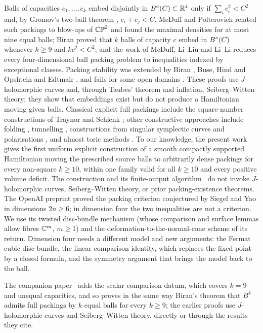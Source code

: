 Balls of capacities $c_1,\dots,c_k$ embed disjointly in $B^{\circ}(C)\subset\mathbb{R}^4$ only if $\sum_ic_i^2<C^2$ and, by Gromov's
two-ball theorem \cite{Gromov1985}, $c_i+c_j<C$. McDuff and Polterovich \cite{McDuffPolterovich1994} related such
packings to blow-ups of $\mathbb{CP}^2$ and found the maximal densities for at most nine equal balls; Biran
\cite{Biran1997} proved that $k$ balls of capacity $c$ embed in $B^{\circ}(C)$ whenever $k\ge9$ and $kc^2<C^2$; and the work
of McDuff, Li--Liu and Li--Li \cite{McDuff1991,McDuff1998,LiLiu2001,LiLi2002} reduces every four-dimensional ball
packing problem to inequalities indexed by exceptional classes. Packing stability was extended by Biran \cite{Biran1999}, Buse, Hind and Opshtein
\cite{BuseHind2011,BuseHind2013,BuseHindOpshtein2016} and Edtmair \cite{Edtmair2025}, and fails for some open domains
\cite{CristofaroGardinerHind2023}. These proofs use $J$-holomorphic curves and, through Taubes' theorem and inflation,
Seiberg--Witten theory; they show that embeddings exist but do not produce a Hamiltonian moving given balls.
Classical explicit full packings include the square-number constructions of Traynor \cite{Traynor1995} and Schlenk
\cite{SchlenkHand,SchlenkBook,Schlenk2018}; other constructive approaches include folding \cite{SchlenkFolding},
tunnelling \cite{Wieck2009}, constructions from singular symplectic curves and polarisations \cite{Opshtein2011,Opshtein2013},
and almost toric methods \cite{Symington2003,CasalsVianna2020}. To our knowledge, the present work gives the first
uniform explicit construction of a smooth compactly supported Hamiltonian moving the prescribed source balls to
arbitrarily dense packings for every non-square $k\ge10$, within one family valid for all $k\ge10$ and every positive
volume deficit. The construction and its finite-output algorithm~\cite{SongHD} do not invoke $J$-holomorphic curves,
Seiberg--Witten theory, or prior packing-existence theorems. The OpenAI preprint \cite{OpenAI2026} proved the packing
criterion conjectured by Siegel and Yao \cite{SiegelYao2025} in dimensions $2n\ge6$; in dimension four the two
inequalities are not a criterion. We use its twisted disc-bundle mechanism (whose comparison and surface lemmas allow
fibres $\mathbb{C}^m$, $m\ge1$) and the deformation-to-the-normal-cone scheme of its return. Dimension four needs a different
model and new arguments: the Fermat cubic disc bundle, the linear comparison identity, which replaces the fixed point by
a closed formula, and the symmetry argument that brings the model back to the ball.

The companion paper~\cite{SongHD} adds the scalar comparison datum, which covers $k=9$ and unequal capacities, and so
proves in the same way Biran's theorem \cite{Biran1997} that $B^4$ admits full packings by $k$ equal balls for every
$k\ge9$; the earlier proofs \cite{Biran1997,Biran1999,BuseHind2013,BuseHindOpshtein2016} use $J$-holomorphic curves and
Seiberg--Witten theory, directly or through the results they cite.

